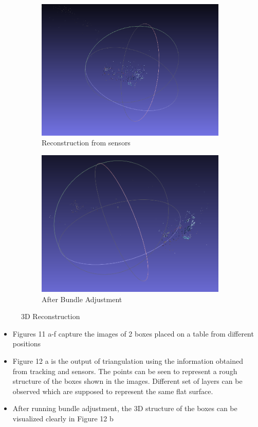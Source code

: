 \documentclass{article}
\begin{document}
\begin{enumerate}
\begin{figure}[H]
\begin{subfigure}{\textwidth}
					  	\includegraphics[width=1.0\linewidth]{1_sensors.png}
					  	\caption{Reconstruction from sensors}
					  	\label{fig:sub2}
					\end{subfigure}
					\begin{subfigure}{\textwidth}
					  	\centering
					  	\includegraphics[width=1.0\linewidth]{1_bundler.png}
					  	\caption{After Bundle Adjustment}
					  	\label{fig:sub2}
					\end{subfigure}
					\caption{3D Reconstruction}
					\label{figstart}


			\end{figure}
					\begin{itemize}
						\item Figures 11 a-f capture the images of 2 boxes placed on a table from different positions
						\item Figure 12 a is the output of triangulation using the information obtained from tracking and sensors. The points can be seen to represent a rough structure of the boxes shown in the images. Different set of layers can be observed which are supposed to represent the same flat surface.
						\item After running bundle adjustment, the 3D structure of the boxes can be visualized clearly in Figure 12 b 
					\end{itemize}	
			\end{enumerate}
\end{document}
